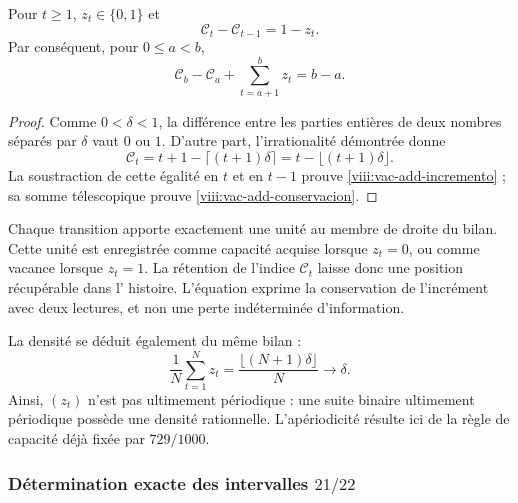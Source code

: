\begin{proposition}
\label{viii:vac-add-balance}
Pour \(t\geq1\), \(z_t\in\{0,1\}\) et
\begin{equation}
 \mathcal C_t-\mathcal C_{t-1}=1-z_t.
 \label{viii:vac-add-incremento}
\end{equation}
Par conséquent, pour \(0\leq a<b\),
\begin{equation}
 \mathcal C_b-\mathcal C_a+
 \sum_{t=a+1}^{b}z_t=b-a.
 \label{viii:vac-add-conservacion}
\end{equation}
\end{proposition}
\begin{proof}
Comme \(0<\delta<1\), la différence entre les parties entières de deux
nombres séparés par \(\delta\) vaut \(0\) ou \(1\). D'autre part,
l'irrationalité démontrée donne
\[
 \mathcal C_t=t+1-\lceil(t+1)\delta\rceil
             =t-\lfloor(t+1)\delta\rfloor.
\]
La soustraction de cette égalité en \(t\) et en \(t-1\) prouve
\eqref{viii:vac-add-incremento} ; sa somme télescopique prouve
\eqref{viii:vac-add-conservacion}.
\end{proof}

Chaque transition apporte exactement une unité au membre de droite du
bilan. Cette unité est enregistrée comme capacité acquise lorsque
\(z_t=0\), ou comme vacance lorsque \(z_t=1\). La rétention de l'indice
\(\mathcal C_t\) laisse donc une position récupérable dans l'
histoire. L'équation exprime la conservation de l'incrément avec deux
lectures, et non une perte indéterminée d'information.

La densité se déduit également du même bilan :
\[
 \frac1N\sum_{t=1}^{N}z_t
 =\frac{\lfloor(N+1)\delta\rfloor}{N}\longrightarrow\delta.
\]
Ainsi, \((z_t)\) n'est pas ultimement périodique : une suite binaire
ultimement périodique possède une densité rationnelle. L'apériodicité
résulte ici de la règle de capacité déjà fixée par \(729/1000\).

\subsubsection{Détermination exacte des intervalles \(21/22\)}
\label{viii:vac-add-primarios}

